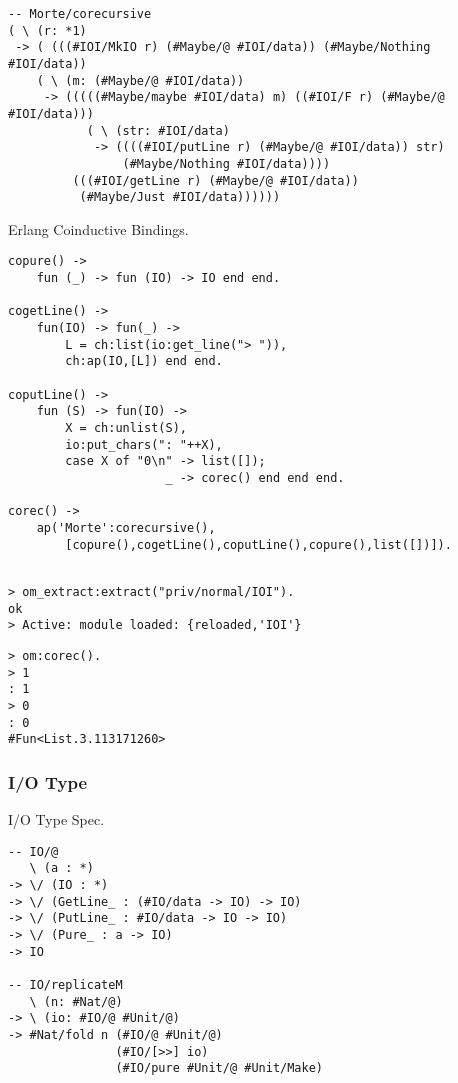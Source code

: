 \documentclass{article}
\begin{document}
\begin{lstlisting}[mathescape=true]
-- Morte/corecursive
( \ (r: *1)
 -> ( (((#IOI/MkIO r) (#Maybe/@ #IOI/data)) (#Maybe/Nothing #IOI/data))
    ( \ (m: (#Maybe/@ #IOI/data))
     -> (((((#Maybe/maybe #IOI/data) m) ((#IOI/F r) (#Maybe/@ #IOI/data)))
           ( \ (str: #IOI/data)
            -> ((((#IOI/putLine r) (#Maybe/@ #IOI/data)) str)
                (#Maybe/Nothing #IOI/data))))
         (((#IOI/getLine r) (#Maybe/@ #IOI/data))
          (#Maybe/Just #IOI/data))))))
\end{lstlisting}

Erlang Coinductive Bindings.

\begin{lstlisting}[mathescape=true]
copure() ->
    fun (_) -> fun (IO) -> IO end end.

cogetLine() ->
    fun(IO) -> fun(_) ->
        L = ch:list(io:get_line("> ")),
        ch:ap(IO,[L]) end end.

coputLine() ->
    fun (S) -> fun(IO) ->
        X = ch:unlist(S),
        io:put_chars(": "++X),
        case X of "0\n" -> list([]);
                      _ -> corec() end end end.

corec() ->
    ap('Morte':corecursive(),
        [copure(),cogetLine(),coputLine(),copure(),list([])]).
\end{lstlisting}

\begin{lstlisting}[mathescape=true]

> om_extract:extract("priv/normal/IOI").
ok
> Active: module loaded: {reloaded,'IOI'}
\end{lstlisting}

\begin{lstlisting}[mathescape=true]
> om:corec().
> 1
: 1
> 0
: 0
#Fun<List.3.113171260>
\end{lstlisting}

\subsubsection{I/O Type}

I/O Type Spec.

\begin{lstlisting}[mathescape=true]
-- IO/@
   \ (a : *)
-> \/ (IO : *)
-> \/ (GetLine_ : (#IO/data -> IO) -> IO)
-> \/ (PutLine_ : #IO/data -> IO -> IO)
-> \/ (Pure_ : a -> IO)
-> IO

-- IO/replicateM
   \ (n: #Nat/@)
-> \ (io: #IO/@ #Unit/@)
-> #Nat/fold n (#IO/@ #Unit/@)
               (#IO/[>>] io)
               (#IO/pure #Unit/@ #Unit/Make)
\end{lstlisting}
\end{document}
